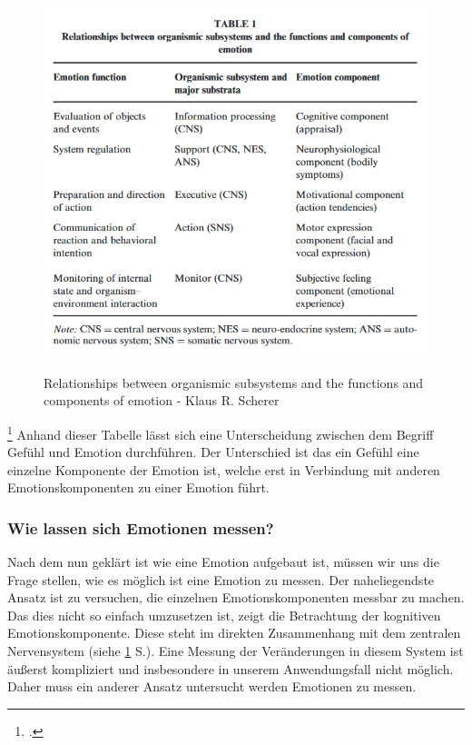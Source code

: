 \begin{figure}[h]
	\centering
	\includegraphics[width=16cm]{Bilder/Relationships-between-organismic-subsystems.png}
	\label{img:Emotion}
	\caption[Relationships between organismic subsystems and the functions and components of
	emotion - Klaus R. Scherer]{Relationships between organismic subsystems and the functions and components of
		emotion - Klaus R. Scherer\footnotemark}
\end{figure}%
\footcitetext[Vgl.][S.698 Table 1]{Kla05}
Anhand dieser Tabelle lässt sich eine Unterscheidung zwischen dem Begriff Gefühl und Emotion durchführen. Der Unterschied ist das ein Gefühl eine einzelne Komponente der Emotion ist, welche erst in Verbindung mit anderen Emotionskomponenten zu einer Emotion führt. 
\subsubsection{Wie lassen sich Emotionen messen?}
Nach dem nun geklärt ist wie eine Emotion aufgebaut ist, müssen wir uns die Frage stellen, wie es möglich ist eine Emotion zu messen. Der naheliegendste Ansatz ist zu versuchen, die einzelnen Emotionskomponenten messbar zu machen. Das dies nicht so einfach umzusetzen ist, zeigt die Betrachtung der kognitiven Emotionskomponente. Diese steht im direkten Zusammenhang mit dem zentralen Nervensystem (siehe \ref{img:Emotion} S.\pageref{img:Emotion}). Eine Messung der Veränderungen in diesem System ist äußerst kompliziert und insbesondere in unserem Anwendungsfall nicht möglich. Daher muss ein anderer Ansatz untersucht werden Emotionen zu messen.
